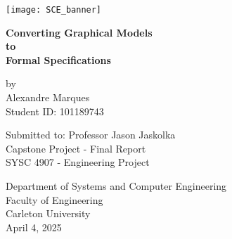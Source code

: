 \begin{titlepage}
    \begin{center}
        \texttt{[image: SCE\_banner]}
        \vfill
        \vspace*{1cm}

        \Large
        \textbf{Converting Graphical Models}\\
        \textbf{to}\\
        \textbf{Formal Specifications}\\


        \vspace{0.5cm}


        \vspace{1.5cm}

        \small
        by\\
        \vspace{0.5cm}
        Alexandre Marques\\
        Student ID: 101189743

        \vfill
        Submitted to: Professor Jason Jaskolka \\
        \vspace{0.8cm}
        Capstone Project - Final Report \\
        SYSC 4907 - Engineering Project

        \vspace{1.5cm}


        Department of Systems and Computer Engineering\\
        Faculty of Engineering\\
        Carleton University\\
        \vspace{1.5cm}
        April 4, 2025

    \end{center}
\end{titlepage}